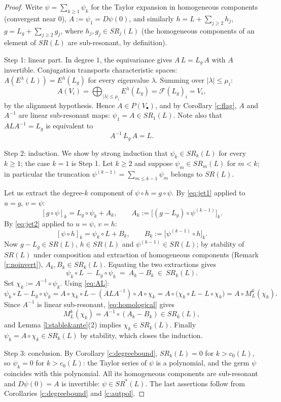 \documentclass[english,11pt]{amsart}
\theoremstyle{definition}
\theoremstyle{remark}
\numberwithin{equation}{section}
\newcommand{\FF}{\mathcal{F}}
\begin{document}
\begin{proof}
Write $\psi=\sum_{k\ge1}\psi_k$ for the Taylor expansion in homogeneous components (convergent near $0$), $A:=\psi_1=D\psi(0)$, and similarly $h=L+\sum_{j\ge2}h_j$, $g=L_g+\sum_{j\ge2}g_j$, where $h_j,g_j\in SR_j(L)$ (the homogeneous components of an element of $SR(L)$ are sub-resonant, by definition).

Step 1: linear part. In degree $1$, the equivariance gives $A\,L=L_g\,A$ with $A$ invertible. Conjugation transports characteristic spaces: $A(E^\lambda(L))=E^\lambda(L_g)$ for every eigenvalue $\lambda$. Summing over $|\lambda|\le\mu_i$:
\[
A(V_i)=\bigoplus_{|\lambda|\le\mu_i}E^\lambda(L_g)=\FF(L_g)_i=V_i,
\]
by the alignment hypothesis. Hence $A\in P(V_\bullet)$, and by Corollary \ref{c:flag}, $A$ and $A^{-1}$ are linear sub-resonant maps: $\psi_1=A\in SR_1(L)$. Note also that $A L A^{-1}=L_g$ is equivalent to
\begin{equation}\label{eq:AL}
A^{-1}\,L_g\,A=L .
\end{equation}

Step 2: induction. We show by strong induction that $\psi_k\in SR_k(L)$ for every $k\ge1$; the case $k=1$ is Step 1. Let $k\ge2$ and suppose $\psi_m\in SR_m(L)$ for $m<k$; in particular the truncation $\psi^{(k-1)}=\sum_{m\le k-1}\psi_m$ belongs to $SR(L)$.

Let us extract the degree-$k$ component of $\psi\circ h=g\circ\psi$. By \eqref{eq:jet1} applied to $u=g$, $v=\psi$:
\[
[g\circ\psi]_k=L_g\circ\psi_k+A_k,\qquad A_k:=\big[(g-L_g)\circ\psi^{(k-1)}\big]_k .
\]
By \eqref{eq:jet2} applied to $u=\psi$, $v=h$:
\[
[\psi\circ h]_k=\psi_k\circ L+B_k,\qquad B_k:=\big[\psi^{(k-1)}\circ h\big]_k .
\]
Now $g-L_g\in SR(L)$, $h\in SR(L)$ and $\psi^{(k-1)}\in SR(L)$; by stability of $SR(L)$ under composition and extraction of homogeneous components (Remark \ref{r:noinvert}), $A_k,B_k\in SR_k(L)$. Equating the two extractions gives
\begin{equation}\label{eq:homological}
\psi_k\circ L\ -\ L_g\circ\psi_k\ =\ A_k-B_k\ \in\ SR_k(L).
\end{equation}
Set $\chi_k:=A^{-1}\circ\psi_k$. Using \eqref{eq:AL}:
\[
\psi_k\circ L-L_g\circ\psi_k
= A\circ\chi_k\circ L- (A L A^{-1})\circ A\circ\chi_k
= A\circ\big(\chi_k\circ L-L\circ\chi_k\big)
= A\circ M^{k}_{L}(\chi_k).
\]
Since $A^{-1}$ is linear sub-resonant, \eqref{eq:homological} gives
\[
M^{k}_{L}(\chi_k)=A^{-1}\circ(A_k-B_k)\in SR_k(L),
\]
and Lemma \ref{l:stable&ante}(2) implies $\chi_k\in SR_k(L)$. Finally $\psi_k=A\circ\chi_k\in SR_k(L)$ by stability, which closes the induction.

Step 3: conclusion. By Corollary \ref{c:degreebound}, $SR_k(L)=0$ for $k>c_0(L)$, so $\psi_k=0$ for $k>c_0(L)$: the Taylor series of $\psi$ is a polynomial, and the germ $\psi$ coincides with this polynomial. All its homogeneous components are sub-resonant and $D\psi(0)=A$ is invertible: $\psi\in SR^*(L)$. The last assertions follow from Corollaries \ref{c:degreebound} and \ref{c:autpol}.
\end{proof}
\end{document}

